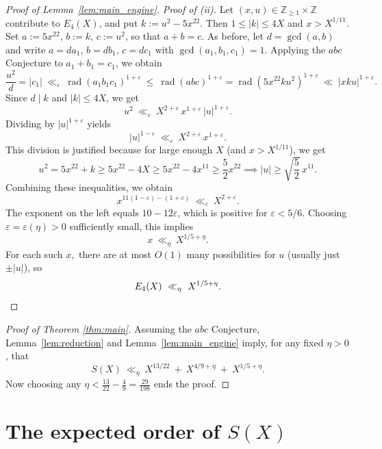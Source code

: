 \documentclass[12pt]{amsart}
\newcommand{\rad}{\operatorname{rad}}
\theoremstyle{remark}
\numberwithin{equation}{section}
\begin{document}
\begin{proof}[Proof of Lemma~\ref{lem:main_engine}]
\smallskip\noindent
\emph{Proof of (ii).}
Let $(x,u)\in\mathbb Z_{\ge 1}\times\mathbb Z$ contribute to $E_4(X)$, and put $k:=u^2-5x^{22}$.
Then $1\le |k|\le 4X$ and $x>X^{1/11}$. Set $a:=5x^{22}$, $b:=k$, $c:=u^2$, so that $a+b=c$.
As before, let $d=\gcd(a,b)$ and write $a=da_1$, $b=db_1$, $c=dc_1$ with $\gcd(a_1,b_1,c_1)=1$.
Applying the $abc$ Conjecture to $a_1+b_1=c_1$, we obtain
\[
\frac{u^2}{d}=|c_1|\ \ll_\varepsilon\ \rad(a_1b_1c_1)^{1+\varepsilon}
\ \le\ \rad(abc)^{1+\varepsilon}
=\rad(5x^{22}ku^2)^{1+\varepsilon}
\ \ll\ |xku|^{1+\varepsilon}.
\]
Since $d\mid k$ and $|k|\le 4X$, we get
\begin{equation}\label{eq:E4-abcbound}
u^2\ \ll_\varepsilon\ X^{2+\varepsilon}\, x^{1+\varepsilon}\, |u|^{1+\varepsilon}.
\end{equation}
Dividing by $|u|^{1+\varepsilon}$ yields
\[
|u|^{1-\varepsilon}\ \ll_\varepsilon\ X^{2+\varepsilon}\, x^{1+\varepsilon}.
\]
This division is justified because for large enough $X$ (and $x > X^{1/11}$), we get
\[ u^2=5x^{22}+k \ge 5x^{22}-4X \ge 5x^{22} - 4x^{11} \ge \frac52 x^{22}
  \implies |u|\ge \sqrt{\frac52}\,x^{11}.  \]
Combining these inequalities, we obtain
\[
x^{11(1-\varepsilon)-(1+\varepsilon)}\ \ll_\varepsilon\ X^{2+\varepsilon}.
\]
The exponent on the left equals $10-12\varepsilon$, which is positive for $\varepsilon<5/6$.
Choosing $\varepsilon=\varepsilon(\eta)>0$ sufficiently small, this implies
\[
x\ \ll_\eta\ X^{1/5+\eta}.
\]
For each such $x,$ there are at most $O(1)$ many possibilities for $u$ (usually just $\pm |u|$), so
\[
E_4(X)\ \ll_\eta\ X^{1/5+\eta}. \qedhere
\]
\end{proof}

\begin{proof}[Proof of Theorem \ref{thm:main}]
Assuming the $abc$ Conjecture, Lemma~\ref{lem:reduction} and Lemma~\ref{lem:main_engine} imply, for any fixed
$\eta>0$, that
\[
S(X)\ \ll_\eta\ X^{13/22}\ +\ X^{4/9+\eta}\ +\ X^{1/5+\eta}.
\]
Now choosing any $\eta < \frac{13}{22} - \frac{4}{9} = \frac{29}{198}$ ends the proof.
\end{proof}

\bigskip


\section{The expected order of $S(X)$}\label{heuristic}
\end{document}
